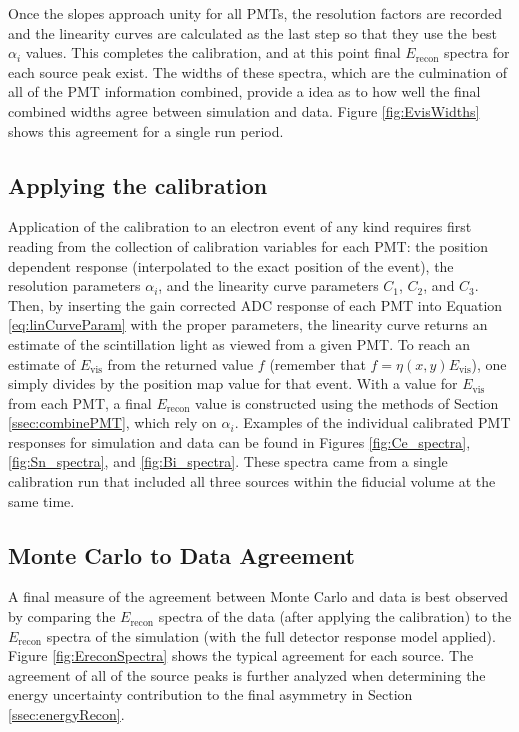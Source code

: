 Once the slopes approach unity for all PMTs, the resolution factors are recorded and the linearity curves
are calculated as the last step so that they use the best $\alpha_i$ values. This completes the calibration,
and at this point final $E_{\mathrm{recon}}$ spectra for each source peak exist. The widths of these
spectra, which are the culmination of all of the PMT information combined, provide a idea as to how well the
final combined widths agree between simulation and data. Figure \ref{fig:EvisWidths} shows this
agreement for a single run period.


\subsection{Applying the calibration} \label{ssec:appCal}

Application of the calibration to an electron event of any kind requires first reading from the collection
of calibration variables for each PMT: the position dependent response (interpolated to the exact position of the event),
the resolution parameters $\alpha_i$, and the linearity curve parameters $C_1$, $C_2$, and $C_3$.
Then, by inserting the gain corrected ADC
response of each PMT into Equation \ref{eq:linCurveParam} with the proper parameters, the linearity curve returns
an estimate of the scintillation light as viewed from a given PMT. To reach an estimate of $E_{\mathrm{vis}}$
from the returned value $f$ (remember that $f = \eta(x,y)E_{\mathrm{vis}}$), one simply divides by the
position map value for that event. With a value for $E_{\mathrm{vis}}$ from each PMT, a final
$E_{\mathrm{recon}}$ value is constructed using the methods of Section \ref{ssec:combinePMT}, which rely on $\alpha_i$.
Examples of the individual calibrated PMT responses for simulation and data
can be found in Figures \ref{fig:Ce_spectra}, \ref{fig:Sn_spectra}, and \ref{fig:Bi_spectra}.
These spectra came from a single calibration run that included all three sources within the fiducial volume at the same time.

\subsection{Monte Carlo to Data Agreement}
A final measure of the agreement between Monte Carlo and data is best observed by comparing the $E_{\mathrm{recon}}$
spectra of the data (after applying the calibration) to the $E_{\mathrm{recon}}$ spectra of the simulation (with
the full detector response model applied). Figure \ref{fig:EreconSpectra} shows the typical agreement for each source.
The agreement of all of the source peaks is further analyzed when determining the energy uncertainty contribution
to the final asymmetry in Section \ref{ssec:energyRecon}.

